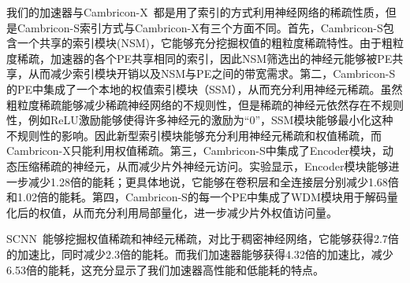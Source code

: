 我们的加速器与Cambricon-X~\cite{zhang2016cambricon}都是用了索引的方式利用神经网络的稀疏性质，但是Cambricon-S索引方式与Cambricon-X有三个方面不同。首先，Cambricon-S包含一个共享的索引模块(NSM)，它能够充分挖掘权值的粗粒度稀疏特性。由于粗粒度稀疏，加速器的各个PE共享相同的索引，因此NSM筛选出的神经元能够被PE共享，从而减少索引模块开销以及NSM与PE之间的带宽需求。第二，Cambricon-S的PE中集成了一个本地的权值索引模块（SSM），从而充分利用神经元稀疏。虽然粗粒度稀疏能够减少稀疏神经网络的不规则性，但是稀疏的神经元依然存在不规则性，例如ReLU激励能够使得许多神经元的激励为“0”，SSM模块能够最小化这种不规则性的影响。因此新型索引模块能够充分利用神经元稀疏和权值稀疏，而Cambricon-X只能利用权值稀疏。第三，Cambricon-S中集成了Encoder模块，动态压缩稀疏的神经元，从而减少片外神经元访问。实验显示，Encoder模块能够进一步减少1.28倍的能耗；更具体地说，它能够在卷积层和全连接层分别减少1.68倍和1.02倍的能耗。第四，Cambricon-S的每一个PE中集成了WDM模块用于解码量化后的权值，从而充分利用局部量化，进一步减少片外权值访问量。

SCNN~\cite{angshuman2017scnn}能够挖掘权值稀疏和神经元稀疏，对比于稠密神经网络，它能够获得2.7倍的加速比，同时减少2.3倍的能耗。而我们加速器能够获得4.32倍的加速比，减少6.53倍的能耗，这充分显示了我们加速器高性能和低能耗的特点。


